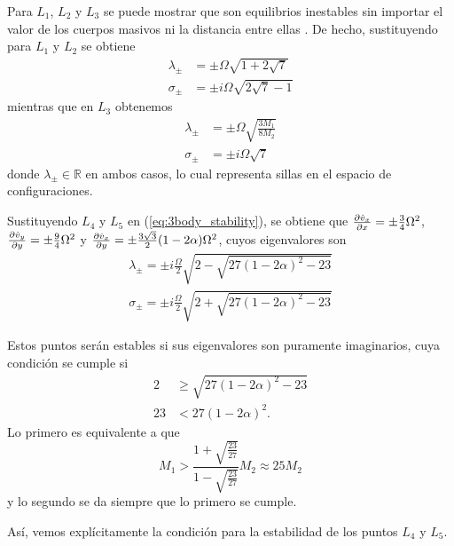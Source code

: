 Para $L_1$, $L_2$ y $L_3$ se puede mostrar que son equilibrios inestables sin importar el valor de los cuerpos masivos ni la distancia entre ellas \cite{algo}. De hecho, sustituyendo para $L_1$ y $L_2$ se obtiene
\begin{align*}
 \lambda_\pm &= \pm \Omega \sqrt{1 + 2\sqrt{7}} \\
 \sigma_\pm &= \pm i \Omega \sqrt{2\sqrt{7} - 1}
\end{align*}
mientras que en $L_3$ obtenemos 
\begin{align*}
 \lambda_\pm &= \pm \Omega \sqrt{ \frac{3M_1}{8M_2} } \\
 \sigma_\pm &= \pm i \Omega \sqrt{7}
\end{align*}
donde $\lambda_\pm \in \mathbb{R}$ en ambos casos, lo cual representa sillas en el espacio de configuraciones.

Sustituyendo $L_4$ y $L_5$ en (\ref{eq:3body_stability}), se obtiene que $\frac{\partial \dot{v}_x}{\partial x} = \pm \frac{3}{4}\Omega^2$, $\frac{\partial \dot{v}_y}{\partial y} = \pm \frac{9}{4}\Omega^2$ y $\frac{\partial \dot{v}_x}{\partial y} = \pm \frac{3\sqrt{3}}{2} (1-2\alpha) \Omega^2$, cuyos eigenvalores son
\begin{align*}
 \lambda_\pm = \pm i \frac{\Omega}{2} \sqrt{ 2 - \sqrt{27(1-2\alpha)^2 - 23} } \\
 \sigma_\pm = \pm i \frac{\Omega}{2} \sqrt{ 2 + \sqrt{27(1-2\alpha)^2 - 23} } 
 \end{align*}

Estos puntos serán estables si sus eigenvalores son puramente imaginarios, cuya condición se cumple si 
\begin{align*}
 2 &\geq \sqrt{27(1-2\alpha)^2 - 23} \\
 23 &< 27(1-2\alpha)^2.
\end{align*}
Lo primero es equivalente a que 
\begin{equation}
 M_1 > \frac{1 + \sqrt{\frac{23}{27}} }{1 - \sqrt{\frac{23}{27}}}M_2 \approx 25M_2
\end{equation}
y lo segundo se da siempre que lo primero se cumple. 

Así, vemos explícitamente la condición para la estabilidad de los puntos $L_4$ y $L_5$. 

